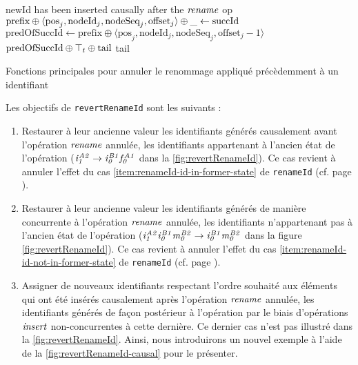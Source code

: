 \begin{algorithm}[!ht]
\begin{algorithmic}[1]
            \Statex \Comment newId has been inserted causally after the $\mathit{rename}$ op
            \State $\text{prefix} \oplus \langle \text{pos}_{j},\text{nodeId}_{j},\text{nodeSeq}_{j},\text{offset}_{j} \rangle \oplus \_ \leftarrow \text{succId}$
            \State $\text{predOfSuccId} \gets \text{prefix} \oplus \langle \text{pos}_j,\text{nodeId}_j,\text{nodeSeq}_j,\text{offset}_{j} - 1 \rangle$
            \State \Return $\text{predOfSuccId} \oplus \top_t \oplus \text{tail}$ \Comment \commenttopt
            \label{alg:revertRenameId-case-iii-max-tuple}
        \Else
            \State \Return tail \label{alg:revertRenameId-case-ii}
        \EndIf
    \EndFunction
  \end{algorithmic}
  \caption{Fonctions principales pour annuler le renommage appliqué précèdemment à un identifiant}
  \label{alg:revertRenameId}
\end{algorithm}

Les objectifs de \texttt{revertRenameId} sont les suivants :
\begin{enumerate}
  \item \label{item:revert-rename-1}
    Restaurer à leur ancienne valeur les identifiants générés causalement avant l'opération $\mathit{rename}$ annulée, \ie les identifiants appartenant à l'ancien état de l'opération (\eg $\mathit{i}^{\mathit{A2}}_{\mathit{1}} \rightarrow \mathit{i}^{\mathit{B1}}_{\mathit{0}}\mathit{f}^{\mathit{A1}}_{\mathit{0}}$ dans la \autoref{fig:revertRenameId}).
    Ce cas revient à annuler l'effet du cas \ref{item:renameId-id-in-former-state} de \texttt{renameId} (cf. page \pageref{item:renameId-id-in-former-state}).
  \item \label{item:revert-rename-2}
    Restaurer à leur ancienne valeur les identifiants générés de manière concurrente à l'opération $\mathit{rename}$ annulée, \ie les identifiants n'appartenant pas à l'ancien état de l'opération (\eg $\mathit{i}^{\mathit{A2}}_{\mathit{1}}\mathit{i}^{\mathit{B1}}_{\mathit{0}}\mathit{m}^{\mathit{B2}}_{\mathit{0}} \rightarrow \mathit{i}^{\mathit{B1}}_{\mathit{0}}\mathit{m}^{\mathit{B2}}_{\mathit{0}}$ dans la figure \autoref{fig:revertRenameId}).
    Ce cas revient à annuler l'effet du cas \ref{item:renameId-id-not-in-former-state} de \texttt{renameId} (cf. page \pageref{item:renameId-id-in-former-state}).
  \item \label{item:revert-rename-3}
    Assigner de nouveaux identifiants respectant l'ordre souhaité aux éléments qui ont été insérés causalement après l'opération $\mathit{rename}$ annulée, \ie les identifiants générés de façon postérieur à l'opération par le biais d'opérations $\mathit{insert}$ non-concurrentes à cette dernière.
    Ce dernier cas n'est pas illustré dans la \autoref{fig:revertRenameId}.
    Ainsi, nous introduirons un nouvel exemple à l'aide de la \autoref{fig:revertRenameId-causal} pour le présenter.
\end{enumerate}

